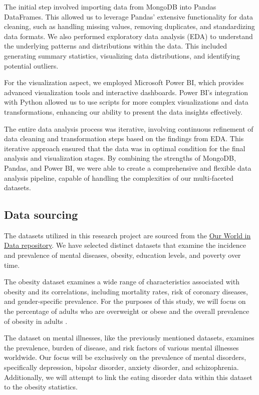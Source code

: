 \documentclass[runningheads]{llncs}
\begin{document}
The initial step involved importing data from MongoDB into Pandas DataFrames. This allowed us to leverage Pandas' extensive functionality for data cleaning, such as handling missing values, removing duplicates, and standardizing data formats. We also performed exploratory data analysis (EDA) to understand the underlying patterns and distributions within the data. This included generating summary statistics, visualizing data distributions, and identifying potential outliers.

For the visualization aspect, we employed Microsoft Power BI, which provides advanced visualization tools and interactive dashboards. Power BI's integration with Python allowed us to use scripts for more complex visualizations and data transformations, enhancing our ability to present the data insights effectively.

The entire data analysis process was iterative, involving continuous refinement of data cleaning and transformation steps based on the findings from EDA. This iterative approach ensured that the data was in optimal condition for the final analysis and visualization stages. By combining the strengths of MongoDB, Pandas, and Power BI, we were able to create a comprehensive and flexible data analysis pipeline, capable of handling the complexities of our multi-faceted datasets.

\subsection{Data sourcing}

The datasets utilized in this research project are sourced from the \href{https://ourworldindata.org/}{Our World in Data repository}. We have selected distinct datasets that examine the incidence and prevalence of mental diseases, obesity, education levels, and poverty over time.

The obesity dataset examines a wide range of characteristics associated with obesity and its correlations, including mortality rates, risk of coronary diseases, and gender-specific prevalence. For the purposes of this study, we will focus on the percentage of adults who are overweight or obese and the overall prevalence of obesity in adults \cite{Obesity}.

The dataset on mental illnesses, like the previously mentioned datasets, examines the prevalence, burden of disease, and risk factors of various mental illnesses worldwide. Our focus will be exclusively on the prevalence of mental disorders, specifically depression, bipolar disorder, anxiety disorder, and schizophrenia. Additionally, we will attempt to link the eating disorder data within this dataset to the obesity statistics\cite{MentalHealth}.
\end{document}
